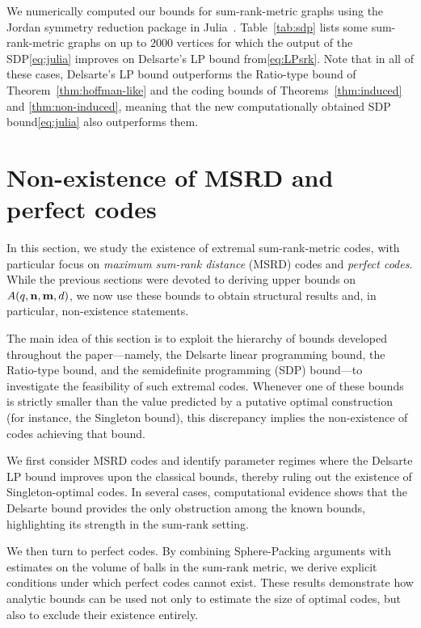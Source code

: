 \documentclass[a4paper]{article}
\begin{document}
We numerically computed our bounds for sum-rank-metric graphs using the Jordan symmetry reduction package in Julia~\cite{BK2022_jordan}. Table~\ref{tab:sdp} lists some sum-rank-metric graphs on up to $2000$ vertices for which the output of the SDP\:\eqref{eq:julia} improves on Delsarte's LP bound from\:\eqref{eq:LPsrk}. Note that in all of these cases, Delsarte's LP bound outperforms the Ratio-type bound of Theorem~\ref{thm:hoffman-like} and the coding bounds of Theorems~\ref{thm:induced} and \ref{thm:non-induced}, meaning that the new computationally obtained SDP bound\:\eqref{eq:julia} also outperforms them.


\section{Non-existence of MSRD and perfect codes}\label{sec:nonexistence}


In this section, we study the existence of extremal sum-rank-metric codes, with particular focus on \emph{maximum sum-rank distance} (MSRD) codes and \emph{perfect codes}. While the previous sections were devoted to deriving upper bounds on $A(q,{\bf n},{\bf m},d)$, we now use these bounds to obtain structural results and, in particular, non-existence statements.

The main idea of this section is to exploit the hierarchy of bounds developed throughout the paper—namely, the Delsarte linear programming bound, the Ratio-type bound, and the semidefinite programming (SDP) bound—to investigate the feasibility of such extremal codes. Whenever one of these bounds is strictly smaller than the value predicted by a putative optimal construction (for instance, the Singleton bound), this discrepancy implies the non-existence of codes achieving that bound.

We first consider MSRD codes and identify parameter regimes where the Delsarte LP bound improves upon the classical bounds, thereby ruling out the existence of Singleton-optimal codes. In several cases, computational evidence shows that the Delsarte bound provides the only obstruction among the known bounds, highlighting its strength in the sum-rank setting.

We then turn to perfect codes. By combining Sphere-Packing arguments with estimates on the volume of balls in the sum-rank metric, we derive explicit conditions under which perfect codes cannot exist. These results demonstrate how analytic bounds can be used not only to estimate the size of optimal codes, but also to exclude their existence entirely.
\end{document}
